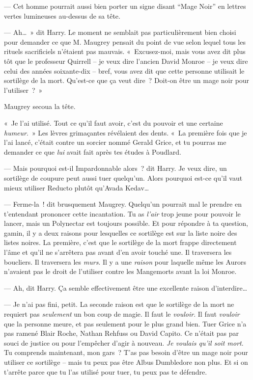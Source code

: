 --- Cet homme pourrait aussi bien porter un signe disant “Mage Noir” en lettres vertes lumineuses au-dessus de sa tête.

--- Ah…~» dit Harry. Le moment ne semblait pas particulièrement bien choisi pour demander ce que M. Maugrey pensait du point de vue selon lequel tous les rituels sacrificiels n'étaient pas mauvais. «~Excusez-moi, mais vous avez dit plus tôt que le professeur Quirrell -- je veux dire l'ancien David Monroe -- je veux dire celui des années soixante-dix -- bref, vous avez dit que cette personne utilisait le sortilège de la mort. Qu'est-ce que ça veut dire~? Doit-on être un mage noir pour l'utiliser~?~»

Maugrey secoua la tête.

«~Je l'ai utilisé. Tout ce qu'il faut avoir, c'est du pouvoir et une certaine \emph{humeur}.~» Les lèvres grimaçantes révélaient des dents. «~La première fois que je l'ai lancé, c'était contre un sorcier nommé Gerald Grice, et tu pourras me demander ce que \emph{lui} avait fait après tes études à Poudlard.

--- Mais pourquoi est-il Impardonnable alors~? dit Harry. Je veux dire, un sortilège de coupure peut aussi tuer quelqu'un. Alors pourquoi est-ce qu'il vaut mieux utiliser Reducto plutôt qu'Avada Kedav…

--- Ferme-la~! dit brusquement Maugrey. Quelqu'un pourrait mal le prendre en t'entendant prononcer cette incantation. Tu as \emph{l'air} trop jeune pour pouvoir le lancer, mais un Polynectar est toujours possible. Et pour répondre à ta question, gamin, il y a deux raisons pour lesquelles ce sortilège est sur la liste noire des listes noires. La première, c'est que le sortilège de la mort frappe directement l'âme et qu'il ne s'arrêtera pas avant d'en avoir touché une. Il traversera les boucliers. Il traversera les \emph{murs}. Il y a une \emph{raison} pour laquelle même les Aurors n'avaient pas le droit de l'utiliser contre les Mangemorts avant la loi Monroe.

--- Ah, dit Harry. Ça semble effectivement être une excellente raison d'interdire…

--- Je n'ai pas fini, petit. La seconde raison est que le sortilège de la mort ne requiert pas \emph{seulement} un bon coup de magie. Il faut le \emph{vouloir}. Il faut \emph{vouloir} que la personne meure, et pas seulement pour le plus grand bien. Tuer Grice n'a pas ramené Blair Roche, Nathan Rehfuss ou David Capito. Ce n'était pas par souci de justice ou pour l'empêcher d'agir à nouveau. \emph{Je voulais qu'il soit mort}. Tu comprends maintenant, mon gars~? T'as pas besoin d'être un mage noir pour utiliser ce sortilège -- mais tu peux pas être Albus Dumbledore non plus. Et si on t'arrête parce que tu l'as utilisé pour tuer, tu peux pas te défendre.

